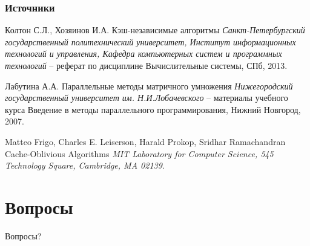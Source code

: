 \documentclass{beamer}
\begin{document}
\begin{frame}
\frametitle{Источники}
\footnotesize{
\begin{thebibliography}{99} %
 Колтон С.Л., Хозяинов И.А.
\newblock Кэш-независимые алгоритмы
\newblock \emph{Санкт-Петербургский государственный политехнический университет, Институт информационных технологий и управления, Кафедра компьютерных систем и программных технологий} -- реферат по дисциплине Вычислительные системы, СПб, 2013.
\end{thebibliography}

\begin{thebibliography}{98}
 Лабутина А.А.
\newblock Параллельные методы матричного умножения
\newblock \emph{Нижегородский государственный университет им. Н.И.Лобачевского} -- материалы учебного курса Введение в методы параллельного программирования, Нижний Новгород, 2007.
\end{thebibliography}

\begin{thebibliography}{97}
 Matteo Frigo, Charles E. Leiserson, Harald Prokop, Sridhar Ramachandran
\newblock Cache-Oblivious Algorithms
\newblock \emph{MIT Laboratory for Computer Science, 545 Technology Square, Cambridge, MA 02139}.
\end{thebibliography}
}
\end{frame}


\section{Вопросы}

\begin{frame}
\Huge{\centerline{Вопросы?}}
\end{frame}

\end{document}
